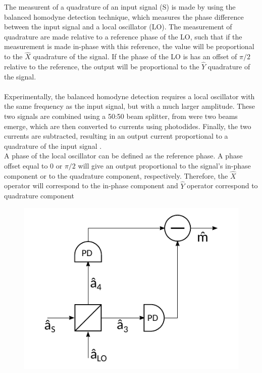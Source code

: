\begin{bibunit}[plain]
The measurent of a quadrature of an input signal (S) is made by using the balanced homodyne detection technique, which measures the phase difference between the input signal and a local oscillator (LO). The measurement of quadrature are made relative to a reference phase of the LO, such that if the measurement is made in-phase with this reference, the value will be proportional to the $\hat{X}$ quadrature of the signal. If the phase of the LO is has an offset of $\pi/2$ relative to the reference, the output will be proportional to the $\hat{Y}$ quadrature of the signal.\\
\\
Experimentally, the balanced homodyne detection requires a local oscillator with the same frequency as the input signal, but with a much larger amplitude. These two signals are combined using a 50:50 beam splitter, from were two beams emerge, which are then converted to currents using photodides. Finally, the two currents are subtracted, resulting in an output current proportional to a quadrature of the input signal
\cite{fox2006}.\\
%
A phase of the local oscillator can be defined as the reference phase. A phase offset equal to $0$ or $\pi/2$ will give an output proportional to the signal's in-phase component or to the quadrature component, respectively. Therefore, the $\hat{X}$ operator will correspond to the in-phase component and $\hat{Y}$ operator correspond to quadrature component
\\
%
\begin{figure}[H]
	\label{fig:scheme_homodyne}
	\centering
	\includegraphics{./sdf/optical_detection/figures/scheme_homodyne.pdf}

\end{figure}
\end{bibunit}
